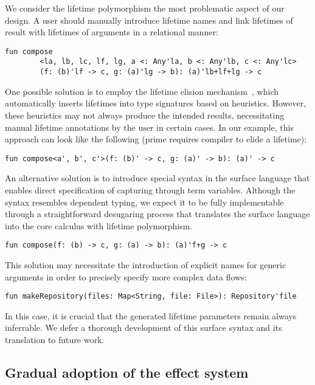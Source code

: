 \documentclass[acmsmall,review,screen]{acmart}
\begin{document}
We consider the lifetime polymorphism the most problematic aspect of our design.
A user should manually introduce lifetime names and link lifetimes of result with lifetimes of arguments in a relational manner:
\begin{lstlisting}[language=colang]
    fun compose
        <la, lb, lc, lf, lg, a <: Any'la, b <: Any'lb, c <: Any'lc>
        (f: (b)'lf -> c, g: (a)'lg -> b): (a)'lb+lf+lg -> c
\end{lstlisting}

One possible solution is to employ the lifetime elision mechanism~\cite{matsakis2014rust}, which automatically inserts lifetimes into type signatures based on heuristics.
However, these heuristics may not always produce the intended results, necessitating manual lifetime annotations by the user in certain cases.
In our example, this approach can look like the following (prime requires compiler to elide a lifetime):
\begin{lstlisting}[language=colang]
    fun compose<a', b', c'>(f: (b)' -> c, g: (a)' -> b): (a)' -> c
\end{lstlisting}

An alternative solution is to introduce special syntax in the surface language that enables direct specification of capturing through term variables.
Although the syntax resembles dependent typing, we expect it to be fully implementable through a straightforward desugaring process that translates the surface language into the core calculus with lifetime polymorphism.
\begin{lstlisting}[language=colang]
    fun compose(f: (b) -> c, g: (a) -> b): (a)'f+g -> c
\end{lstlisting}

This solution may necessitate the introduction of explicit names for generic arguments in order to precisely specify more complex data flows:
\begin{lstlisting}[language=colang]
    fun makeRepository(files: Map<String, file: File>): Repository'file
\end{lstlisting}

In this case, it is crucial that the generated lifetime parameters remain always inferrable.
We defer a thorough development of this surface syntax and its translation to future work.

\subsection{Gradual adoption of the effect system}
\end{document}
